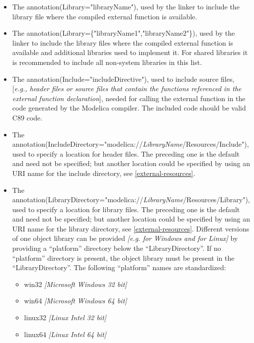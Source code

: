 \documentclass[10pt,a4paper]{report}
\begin{document}
\begin{itemize}
\item
  The annotation(Library="libraryName"), used by the linker to include
  the library file where the compiled external function is available.
\item
  The annotation(Library=\{"libraryName1","libraryName2"\}), used by the
  linker to include the library files where the compiled external
  function is available and additional libraries used to implement it.
  For shared libraries it is recommended to include all non-system
  libraries in this list.
\item
  The annotation(Include="includeDirective"), used to include source
  files, {[}\emph{e.g., header files or source files that contain the
  functions referenced in the external function declaration}{]}, needed
  for calling the external function in the code generated by the
  Modelica compiler. The included code should be valid C89 code.
\item
  The
  annotation(IncludeDirectory="modelica://\emph{LibraryName}/Resources/Include"),
  used to specify a location for header files. The preceding one is the
  default and need not be specified; but another location could be
  specified by using an URI name for the include directory, see \ref{external-resources}.
\item
  The
  annotation(LibraryDirectory="modelica://\emph{LibraryName}/Resources/Library"),
  used to specify a location for library files. The preceding one is the
  default and need not be specified; but another location could be
  specified by using an URI name for the library directory, see \ref{external-resources}. 
  Different versions of one object library can be provided
  \emph{{[}e.g. for Windows and for Linux{]}} by providing a
  ``platform'' directory below the ``LibraryDirectory''. If no
  ``platform'' directory is present, the object library must be present
  in the ``LibraryDirectory''. The following ``platform'' names are
  standardized:

  \begin{itemize}
  \item
    win32 \emph{{[}Microsoft Windows 32 bit{]}}
  \item
    win64 \emph{{[}Microsoft Windows 64 bit{]}}
  \item
    linux32 \emph{{[}Linux Intel 32 bit{]}}
  \item
    linux64 \emph{{[}Linux Intel 64 bit{]}}
  \end{itemize}
\end{itemize}
\end{document}

